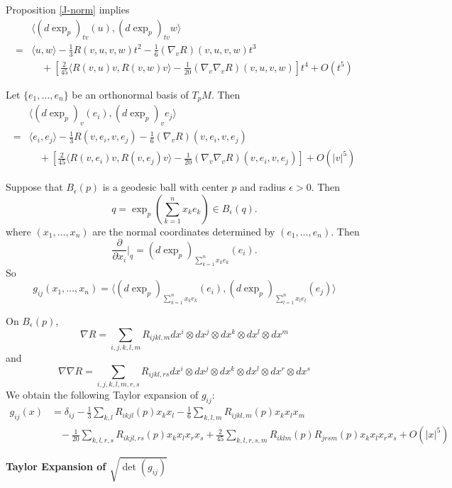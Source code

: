 \documentclass{amsart}
\numberwithin{equation}{section}
\theoremstyle{definition}
\theoremstyle{theorem}
\begin{document}
Proposition \ref{J-norm} implies
\begin{align*}
 & \langle (d \exp_p)_{tv}(u) , (d\exp_p)_{tv}w \rangle \\
= &\langle u, w \rangle - \frac{1}{3} R(v,u,v,w) t^2 - \frac{1}{6} (\nabla_v R)(v,u,v,w) t^3 \\
& \quad + \left[ \frac{2}{45} \langle R(v,u)v, R(v,w)v \rangle - \frac{1}{20} (\nabla_v\nabla_vR)(v,u,v,w) \right]t^4 + O(t^5)
\end{align*}


Let $\{e_1,\ldots, e_n\}$ be an orthonormal basis of $T_pM$. Then
\begin{align*}
&\langle (d \exp_p)_{v}(e_i) , (d\exp_p)_{v}e_j \rangle \\
=& \langle e_i, e_j \rangle - \frac{1}{3} R(v,e_i,v,e_j)  - \frac{1}{6} (\nabla_v R)(v,e_i,v,e_j)  \\
&\quad + \left[ \frac{2}{45} \langle R(v,e_i)v, R(v,e_j)v \rangle - \frac{1}{20} (\nabla_v\nabla_vR)(v,e_i,v,e_j) \right] + O(|v|^5)
\end{align*}

Suppose that $B_\epsilon(p)$ is a geodesic ball with center $p$ and radius $\epsilon>0$. 
Then
$$
q=\exp_p(\sum_{k=1}^n x_k e_k) \in B_\epsilon(q).
$$
where $(x_1,\ldots, x_n)$ are the normal coordinates determined by $(e_1,\ldots, e_n)$.
Then
$$
\frac{\partial}{\partial x_i}\Big|_q = (d\exp_p)_{\sum_{k=1}^n x_k e_k}(e_i).
$$
So
$$
g_{ij}(x_1,\ldots, x_n )= \langle (d\exp_p)_{\sum_{k=1}^n x_k e_k}(e_i), (d\exp_p)_{\sum_{l=1}^n x_l e_l} (e_j)\rangle
$$

On $B_\epsilon(p)$, 
\[
\nabla R = \sum_{i,j,k,l,m} R_{ijkl,m} dx^i \otimes dx^j \otimes dx^k \otimes dx^l \otimes dx^m
\]
and 
\[
\nabla \nabla R =\sum_{i,j,k,l,m,r,s} R_{ijkl, rs} dx^i \otimes dx^j \otimes dx^k \otimes dx^l \otimes dx^r \otimes dx^s
\]
We obtain the following Taylor expansion of $g_{ij}$:
\[
\boxed{
\begin{aligned}
g_{ij}(x) &= \delta_{ij} - \frac{1}{3} \sum_{k,l} R_{ikjl}(p) x_k x_l
 - \frac{1}{6} \sum_{k,l,m} R_{ijkl,m}(p) x_kx_lx_m \\
&\;\;\; - \frac{1}{20} \sum_{k,l,r,s}R_{ikjl,rs}(p) x_kx_lx_r x_s + \frac{2}{45} 
\sum_{k,l,r,s,m} R_{iklm}(p)R_{jrsm}(p) x_kx_lx_rx_s + O(|x|^5)
\end{aligned} }
\]

\bigskip

\noindent
{\bf \large Taylor Expansion of $\sqrt{ \det(g_{ij})}$}

\smallskip
\end{document}
